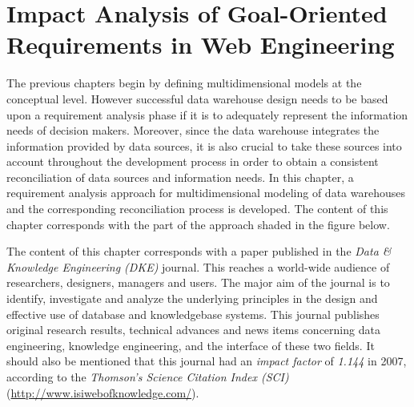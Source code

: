 %
%
%




\chapter{Impact Analysis of Goal-Oriented Requirements in Web Engineering}
\label{c5} %

The previous chapters begin by defining multidimensional models at
the conceptual level. However successful data warehouse design needs
to be based upon a requirement analysis phase if it is to adequately
represent the information needs of decision makers. Moreover, since
the data warehouse integrates the information provided by data
sources, it is also crucial to take these sources into account
throughout the development process in order to obtain a consistent
reconciliation of data sources and information needs. In this
chapter, a requirement analysis approach for multidimensional
modeling of data warehouses and the corresponding reconciliation
process is developed. The content of this chapter corresponds with
the part of the approach shaded in the figure below.




The content of this chapter corresponds with a paper published in
the \emph{Data \& Knowledge Engineering (DKE)} journal. This reaches
a world-wide audience of researchers, designers, managers and users.
The major aim of the journal is to identify, investigate and analyze
the underlying principles in the design and effective use of
database and knowledgebase systems. This journal publishes original
research results, technical advances and news items concerning data
engineering, knowledge engineering, and the interface of these two
fields. It should also be mentioned that this journal had an
\emph{impact factor} of \emph{1.144} in 2007, according to the
\emph{Thomson's Science Citation Index (SCI)}
(\url{http://www.isiwebofknowledge.com/}).


